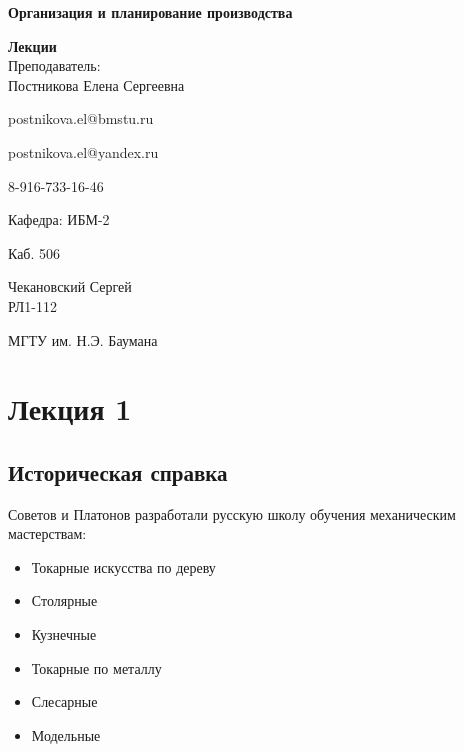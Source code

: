 \documentclass[14pt,a4paper,oneside]{extarticle}
\begin{document}


\begin{titlepage}
    \begin{center}
        \vspace*{1cm}

        \Huge
        \textbf{Организация и планирование производства}
        \vspace{1.5cm}

        \vfill
        \Huge
        \textbf{Лекции}\\
        \vspace{0.5cm}
        \LARGE
        Преподаватель:\\Постникова Елена Сергеевна

        postnikova.el@bmstu.ru

        postnikova.el@yandex.ru

        8-916-733-16-46


        \vspace{1.5cm}

        Кафедра: ИБМ-2

        Каб. 506

        \vfill

        \LARGE
        Чекановский Сергей\\
        РЛ1-112

        \vspace{0.8cm}


        \Large
        МГТУ им. Н.Э. Баумана

    \end{center}
\end{titlepage}

\tableofcontents

\clearpage

\section{Лекция 1}

\subsection{Историческая справка}

Советов и Платонов разработали русскую школу обучения механическим мастерствам:

\begin{itemize}
    \item Токарные искусства по дереву
    \item Столярные
    \item Кузнечные
    \item Токарные по металлу
    \item Слесарные
    \item Модельные
\end{itemize}
\end{document}
